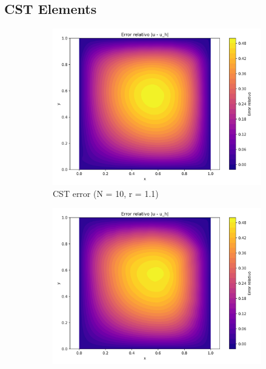 \documentclass[12pt]{article}
\begin{document}
\subsection{CST Elements}

\begin{figure}[H]
    \centering
    \begin{subfigure}[t]{0.32\textwidth}
        \centering
        \includegraphics[width=\textwidth]{Graficos/11/CST_relative_error_colormap.png}
        \caption{CST error (N = 10, r = 1.1)}
        \label{fig:cst_error_r1.1}
    \end{subfigure}
    \hfill
    \begin{subfigure}[t]{0.32\textwidth}
        \centering
        \includegraphics[width=\textwidth]{Graficos/12/CST_relative_error_colormap.png}

\end{subfigure}
\end{figure}
\end{document}
